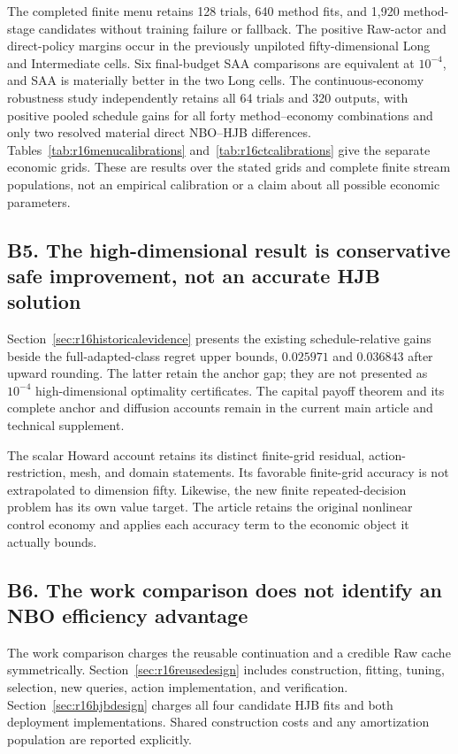 The completed finite menu retains 128 trials, 640 method fits, and 1,920 method-stage candidates without training failure or fallback. The positive Raw-actor and direct-policy margins occur in the previously unpiloted fifty-dimensional Long and Intermediate cells. Six final-budget SAA comparisons are equivalent at $10^{-4}$, and SAA is materially better in the two Long cells. The continuous-economy robustness study independently retains all 64 trials and 320 outputs, with positive pooled schedule gains for all forty method--economy combinations and only two resolved material direct NBO--HJB differences. Tables~\ref{tab:r16menucalibrations} and~\ref{tab:r16ctcalibrations} give the separate economic grids. These are results over the stated grids and complete finite stream populations, not an empirical calibration or a claim about all possible economic parameters.

\subsection*{B5. The high-dimensional result is conservative safe improvement, not an accurate HJB solution}\label{resp:B5}
Section~\ref{sec:r16historicalevidence} presents the existing schedule-relative gains beside the full-adapted-class regret upper bounds, $0.025971$ and $0.036843$ after upward rounding. The latter retain the anchor gap; they are not presented as $10^{-4}$ high-dimensional optimality certificates. The capital payoff theorem and its complete anchor and diffusion accounts remain in the current main article and technical supplement.

The scalar Howard account retains its distinct finite-grid residual, action-restriction, mesh, and domain statements. Its favorable finite-grid accuracy is not extrapolated to dimension fifty. Likewise, the new finite repeated-decision problem has its own value target. The article retains the original nonlinear control economy and applies each accuracy term to the economic object it actually bounds.

\subsection*{B6. The work comparison does not identify an NBO efficiency advantage}\label{resp:B6}
The work comparison charges the reusable continuation and a credible Raw cache symmetrically. Section~\ref{sec:r16reusedesign} includes construction, fitting, tuning, selection, new queries, action implementation, and verification. Section~\ref{sec:r16hjbdesign} charges all four candidate HJB fits and both deployment implementations. Shared construction costs and any amortization population are reported explicitly.

